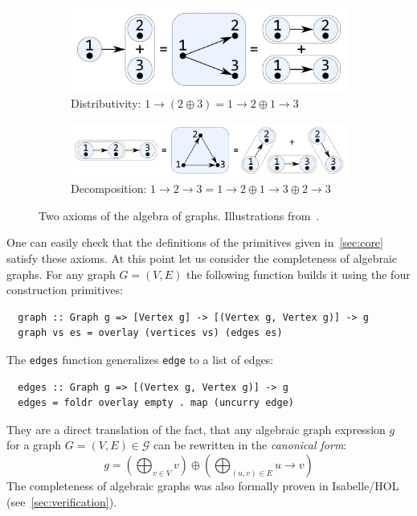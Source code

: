 \documentclass{article}
\newcommand{\hs}{\texttt}
\newcommand{\overlay}{\oplus}
\newcommand{\connect}{\rightarrow}
\begin{document}
\begin{figure}
  \begin{subfigure}[b]{0.4\linewidth}
    \centerline{\includegraphics[scale=0.24]{fig/ax-distributivity.pdf}}
    \caption{Distributivity: $1 \connect (2 \overlay 3) = 1 \connect 2 \overlay
      1 \connect 3$ }
  \end{subfigure}
  \hspace{12mm}
  \begin{subfigure}[b]{0.5\linewidth}
    \centerline{\includegraphics[scale=0.24]{fig/ax-decomposition.pdf}}
    \caption{Decomposition: $1 \connect 2 \connect 3 = 1 \connect 2 \overlay
      {1 \connect 3} \overlay {2 \connect 3}$}
  \end{subfigure}
  \vspace{-1mm}
  \caption{Two axioms of the algebra of graphs. Illustrations from~\cite{mokhov2017algebraic}.\label{fig:axioms}}
\end{figure}
One can easily check that the definitions of the primitives given
in~\autoref{sec:core} satisfy these axioms. At this point let us consider the
completeness of algebraic graphs. For any graph $G=(V,E)$ the following function
builds it using the four construction primitives:
\begin{verbatim}
  graph :: Graph g => [Vertex g] -> [(Vertex g, Vertex g)] -> g
  graph vs es = overlay (vertices vs) (edges es)
\end{verbatim}
The \hs{edges} function generalizes \hs{edge} to a list of edges:
\begin{verbatim}
  edges :: Graph g => [(Vertex g, Vertex g)] -> g
  edges = foldr overlay empty . map (uncurry edge)
\end{verbatim}
They are a direct translation of the fact, that any algebraic graph expression
$g$ for a graph $G=(V,E) \in \mathcal{G}$ can be rewritten in the 
\textit{canonical form}:
\[
  g = \left( \bigoplus_{v \in V} v \right) \oplus \left( \bigoplus_{(u,v) \in E}
  u \connect v \right)
\]
The completeness of algebraic graphs was also formally proven in Isabelle/HOL
(see~\autoref{sec:verification}).
\end{document}
